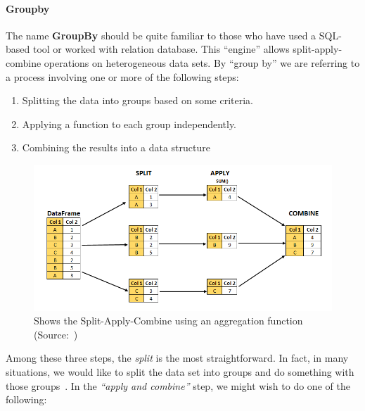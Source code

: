 \paragraph{Groupby}
The name \textbf{GroupBy} should be quite familiar to those who have used a SQL-based tool or worked with relation database. This ``engine'' allows split-apply-combine operations on heterogeneous data sets.
By ``group by'' we are referring to a process involving one or more of the following steps:
\begin{enumerate}
    \item Splitting the data into groups based on some criteria.
    \item Applying a function to each group independently.
    \item Combining the results into a data structure
\end{enumerate}
\begin{figure}[ht]
    \centering
    \includegraphics[width=\textwidth]{content/chapter_3/images/split-apply-combine.png}
    \caption{Shows the Split-Apply-Combine using an aggregation function (Source:~\cite{Misc:pandey_split-apply-combine})}\label{fig:pandas_groupby}
\end{figure}
Among these three steps, the \textit{split} is the most straightforward. In fact, in many situations, we would like to split the data set into groups and do something with those groups~\cite{reback_pandas-dev/pandas:_2022}.
In the \textit{``apply and combine''} step, we might wish to do one of the following:
